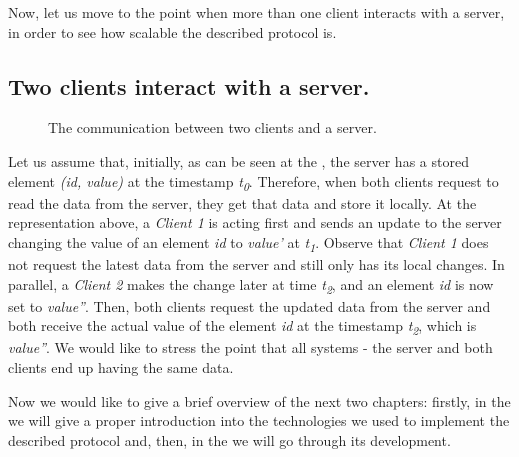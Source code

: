 Now, let us move to the point when more than one client interacts with a server, in order to see how scalable the described protocol is.

\subsection*{Two clients interact with a server.}

\begin{figure}[!htb]
    \begin{center}
    \def\svgwidth{\linewidth}
    
    \caption {The communication between two clients and a server.}
    \label{fig:design5}
\end{center}
\end{figure}

Let us assume that, initially, as can be seen at the , the server has a stored element \textit{(id, value)} at the timestamp \textit{t\textsubscript{0}}. Therefore, when both clients request to read the data from the server, they get that data and store it locally. At the representation above, a \textit{Client 1} is acting first and sends an update to the server changing the value of an element \textit{id} to \textit{value'} at \textit{t\textsubscript{1}}. Observe that \textit{Client 1} does not request the latest data from the server and still only has its local changes. In parallel, a \textit{Client 2} makes the change later at time \textit{t\textsubscript{2}}, and an element \textit{id} is now set to \textit{value''}. Then, both clients request the updated data from the server and both receive the actual value of the element \textit{id} at the timestamp \textit{t\textsubscript{2}}, which is \textit{value''}. We would like to stress the point that all systems - the server and both clients end up having the same data.

Now we would like to give a brief overview of the next two chapters: firstly, in the  we will give a proper introduction into the technologies we used to implement the described protocol and, then, in the  we will go through its development.